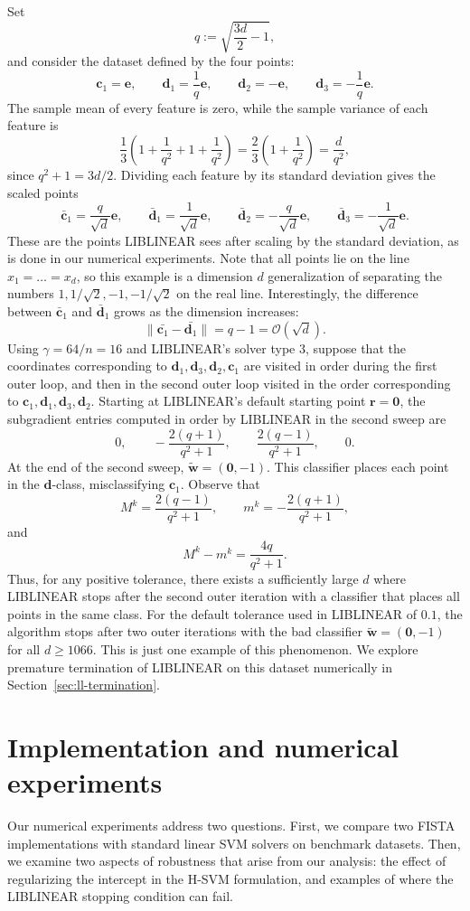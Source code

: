 \documentclass[twoside,11pt]{article}
\newcommand\bz{\bm{0}}
\renewcommand{\c}{\bm{c}}
\renewcommand{\d}{\bm{d}}
\renewcommand\r{\bm{r}}
\newcommand\w{\bm{w}}
\newcommand\e{\bm{e}}
\renewcommand\O{\mathcal{O}}
\newcommand\tw{\tilde{\w}}
\begin{document}
    Set
    \[
        q := \sqrt{\frac{3d}{2}-1},
    \]
    and consider the dataset defined by the four points:
    \[
        \c_1 = \e,\qquad \d_1 = \frac{1}{q}\e,\qquad \d_2 = -\e,\qquad \d_3 = -\frac{1}{q}\e.
    \]
    The sample mean of every feature is zero, while the sample variance of each feature is
    \[
        \frac{1}{3}\left(1 + \frac{1}{q^2} + 1 + \frac{1}{q^2}\right) = \frac{2}{3}\left(1 + \frac{1}{q^2}\right) = \frac{d}{q^2},
    \]
    since $q^2 + 1 = 3d/2$. Dividing each feature by its standard deviation gives the scaled points
    \[
        \bar{\c}_1 = \frac{q}{\sqrt{d}}\e,\qquad \bar{\d}_1 = \frac{1}{\sqrt{d}}\e,\qquad \bar{\d}_2 = -\frac{q}{\sqrt{d}}\e,\qquad \bar{\d}_3 = -\frac{1}{\sqrt{d}}\e.
    \]
    These are the points LIBLINEAR sees after scaling by the standard deviation, as is done in our numerical experiments. Note that all points lie on the line $x_1 = \hdots = x_d$, so this example is a dimension $d$ generalization of separating the numbers $1, 1/\sqrt{2}, -1, -1/\sqrt{2}$ on the real line. Interestingly, the difference between $\bar{\c}_1$ and $\bar{\d}_1$ grows as the dimension increases:
    \[
        \|\bar{\c_1} - \bar{\d_1}\| = q - 1 = \O(\sqrt{d}).
    \]
    Using $\gamma = 64/n = 16$ and LIBLINEAR's solver type $3$, suppose that the coordinates corresponding to $\d_1,\d_3,\d_2,\c_1$ are visited in order during the first outer loop, and then in the second outer loop visited in the order corresponding to $\c_1,\d_1,\d_3,\d_2$. Starting at LIBLINEAR's default starting point $\r = \bz$, the subgradient entries computed in order by LIBLINEAR in the second sweep are
    \[
        0,\qquad -\frac{2(q+1)}{q^2 + 1},\qquad \frac{2(q-1)}{q^2 + 1},\qquad 0.
    \]
    At the end of the second sweep, $\tw = (\bz,-1)$. This classifier places each point in the $\d$-class, misclassifying $\c_1$.  
    Observe that
    \[
        M^k = \frac{2(q-1)}{q^2 + 1},\qquad m^k = -\frac{2(q+1)}{q^2 + 1},
    \]
    and
    \[
        M^k - m^k = \frac{4q}{q^2 + 1}.
    \]
    Thus, for any positive tolerance, there exists a sufficiently large $d$ where LIBLINEAR stops after the second outer iteration with a classifier that places all points in the same class. For the default tolerance used in LIBLINEAR of $0.1$, the algorithm stops after two outer iterations with the bad classifier $\tw = (\bz,-1)$ for all $d \geq 1066$. This is just one example of this phenomenon. We explore premature termination of LIBLINEAR on this dataset numerically in Section~\ref{sec:ll-termination}.

\section{Implementation and numerical experiments} \label{sec:numerics}
Our numerical experiments address two questions. First, we compare two FISTA implementations with standard linear SVM solvers on benchmark datasets. Then, we examine two aspects of robustness that arise from our analysis: the effect of regularizing the intercept in the H-SVM formulation, and examples of where the LIBLINEAR stopping condition can fail.
\end{document}
